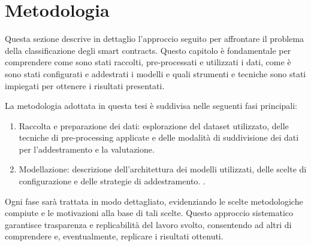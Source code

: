 \documentclass[../../Thesis.tex]{subfiles}
\begin{document}
\chapter{Metodologia}
Questa sezione descrive in dettaglio l'approccio seguito per affrontare il problema della classificazione degli smart contracts. Questo capitolo è fondamentale per comprendere come sono stati raccolti, pre-processati e utilizzati i dati, come è sono stati configurati e addestrati i modelli e quali strumenti e tecniche sono stati impiegati per ottenere i risultati presentati.

La metodologia adottata in questa tesi è suddivisa nelle seguenti fasi principali:
\begin{enumerate}
    \item Raccolta e preparazione dei dati: esplorazione del dataset utilizzato, delle tecniche di pre-processing applicate e delle modalità di suddivisione dei dati per l'addestramento e la valutazione.
    \item Modellazione: descrizione dell'architettura dei modelli utilizzati, delle scelte di configurazione e delle strategie di addestramento.
.
\end{enumerate}
Ogni fase sarà trattata in modo dettagliato, evidenziando le scelte metodologiche compiute e le motivazioni alla base di tali scelte. Questo approccio sistematico garantisce trasparenza e replicabilità del lavoro svolto, consentendo ad altri  di comprendere e, eventualmente, replicare i risultati ottenuti.
    
\end{document}
